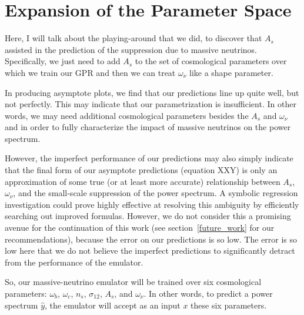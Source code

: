 \chapter{Expansion of the Parameter Space}


Here, I will talk about the playing-around that we did, to discover that
$A_s$ assisted in the prediction of the suppression due to massive neutrinos.
Specifically, we just need to add $A_s$ to the set of cosmological parameters
over which we train our GPR and then we can treat $\omega_\nu$ like a shape
parameter.

In producing asymptote plots, we find that our predictions line up quite well,
but not perfectly. This may indicate that our parametrization is insufficient.
In other words, we may need additional cosmological parameters besides the
$A_s$ and $\omega_\nu$ and in order to fully characterize the impact of
massive neutrinos on the power spectrum.

However, the imperfect performance of our predictions may also simply
indicate that the final form of our asymptote predictions (equation XXY) is
only an approximation of some true (or at least more accurate) relationship
between $A_s$, $\omega_\nu$, and the small-scale suppression of the power
spectrum. A symbolic regression investigation could prove highly effective at
resolving this ambiguity by efficiently searching out improved formulas. 
However, we do not consider this a promising avenue
for the continuation of this work (see section~\ref{future_work} for our
recommendations), because the error on our predictions is so low. The error
is so low here that we do not believe the imperfect predictions to
significantly detract from the performance of the emulator.


So, our massive-neutrino emulator will be trained over six cosmological
parameters: $\omega_b$, $\omega_c$, $n_s$, $\sigma_{12}$, $A_s$, and
$\omega_\nu$. In other words, to predict a power
spectrum $\hat{y}$, the emulator will accept as an input $x$ these six
parameters.

